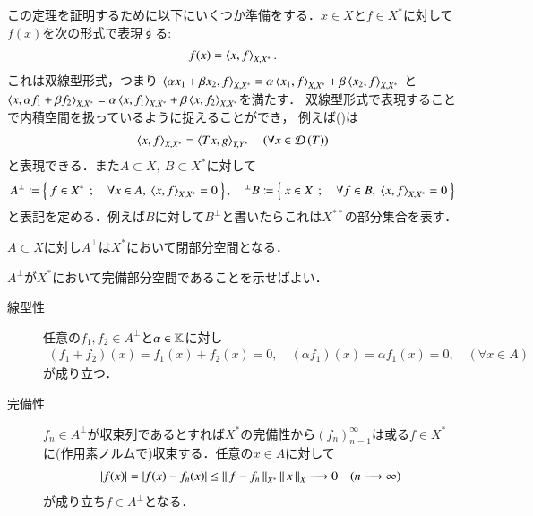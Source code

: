 	この定理を証明するために以下にいくつか準備をする．$x \in X$と$f \in X^*$に対して$f(x)$を次の形式で表現する:
	\begin{align}
		f(x) = \inprod<x,f>_{X,X^*}.
	\end{align}
	これは双線型形式，つまり
	$\inprod<\alpha x_1 + \beta x_2,f>_{X,X^*} = \alpha \inprod<x_1,f>_{X,X^*} + \beta\inprod<x_2,f>_{X,X^*}$
	と$\inprod<x,\alpha f_1 + \beta f_2>_{X,X^*} = \alpha \inprod<x,f_1>_{X,X^*} + \beta\inprod<x,f_2>_{X,X^*}$を満たす．
	双線型形式で表現することで内積空間を扱っているように捉えることができ，
	例えば()は
	\begin{align}
		\inprod<x,f>_{X,X^*} = \inprod<Tx,g>_{Y,Y^*} \quad (\forall x \in \Dom{T} )
	\end{align}
	と表現できる．また$A \subset X,\ B \subset X^*$に対して
	\begin{align}
		A^{\perp} \coloneqq \Set{f \in X^*}{\forall x \in A,\ \inprod<x,f>_{X,X^*} = 0}, \quad 
		{}^{\perp}B \coloneqq \Set{x \in X}{\forall f \in B,\ \inprod<x,f>_{X,X^*} = 0}
	\end{align}
	と表記を定める．例えば$B$に対して$B^{\perp}$と書いたらこれは$X^{**}$の部分集合を表す．
	
	\begin{screen}
		\begin{lem}
			$A \subset X$に対し$A^{\perp}$は$X^*$において閉部分空間となる．
			\label{lem:T_star_closed_1}
		\end{lem}
	\end{screen}
	
	\begin{prf}
		$A^{\perp}$が$X^*$において完備部分空間であることを示せばよい．
		\begin{description}
			\item[線型性]
				任意の$f_1,f_2 \in A^{\perp}$と$\alpha \in \mathbb{K}$に対し
				\begin{align}
					(f_1 + f_2)(x) = f_1(x) + f_2(x) = 0, \quad (\alpha f_1)(x) = \alpha f_1(x) = 0
					,\quad (\forall x \in A)
				\end{align}
				が成り立つ．
				
			\item[完備性]
				$f_n \in A^{\perp}$が収束列であるとすれば$X^*$の完備性から$(f_n)_{n=1}^{\infty}$は或る$f \in X^*$
				に(作用素ノルムで)収束する．任意の$x \in A$に対して
				\begin{align}
					|f(x)| = |f(x) - f_n(x)| \leq \left\|\, f-f_n\, \right\|_{X^*}\left\|\, x\, \right\|_{X} \longrightarrow 0 \quad (n \longrightarrow \infty)
				\end{align}
				が成り立ち$f \in A^{\perp}$となる．
		\end{description}
		\QED
	\end{prf}
	
